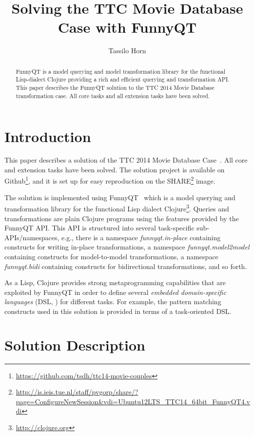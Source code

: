 \documentclass[submission]{eptcs}
\title{Solving the TTC Movie Database Case with FunnyQT}
\author{Tassilo Horn
  \institute{Institute for Software Technology, University Koblenz-Landau, Germany}
  \email{horn@uni-koblenz.de}}
\begin{document}
\maketitle

\begin{abstract}
  FunnyQT is a model querying and model transformation library for the
  functional Lisp-dialect Clojure providing a rich and efficient querying and
  transformation API.  This paper describes the FunnyQT solution to the TTC
  2014 Movie Database transformation case.  All core tasks and all extension
  tasks have been solved.
\end{abstract}


\section{Introduction}
\label{sec:introduction}

This paper describes a solution of the TTC 2014 Movie Database
Case~\cite{movies-case-desc}.  All core and extension tasks have been solved.
The solution project is available on
Github\footnote{\url{https://github.com/tsdh/ttc14-movie-couples}}, and it is
set up for easy reproduction on the
SHARE\footnote{\url{http://is.ieis.tue.nl/staff/pvgorp/share/?page=ConfigureNewSession&vdi=Ubuntu12LTS_TTC14_64bit_FunnyQT4.vdi}}
image.

The solution is implemented using FunnyQT~\cite{Horn2013MQWFQ} which is a model
querying and transformation library for the functional Lisp dialect
Clojure\footnote{\url{http://clojure.org}}.  Queries and transformations are
plain Clojure programs using the features provided by the FunnyQT API.  This
API is structured into several task-specific sub-APIs/namespaces, e.g., there
is a namespace \emph{funnyqt.in-place} containing constructs for writing
in-place transformations, a namespace \emph{funnyqt.model2model} containing
constructs for model-to-model transformations, a namespace \emph{funnyqt.bidi}
containing constructs for bidirectional transformations, and so forth.

As a Lisp, Clojure provides strong metaprogramming capabilities that are
exploited by FunnyQT in order to define several \emph{embedded domain-specific
  languages} (DSL, \cite{book:Fowler2010DSL}) for different tasks.  For
example, the pattern matching constructs used in this solution is provided in
terms of a task-oriented DSL.


\section{Solution Description}
\label{sec:solution-description}
\end{document}
